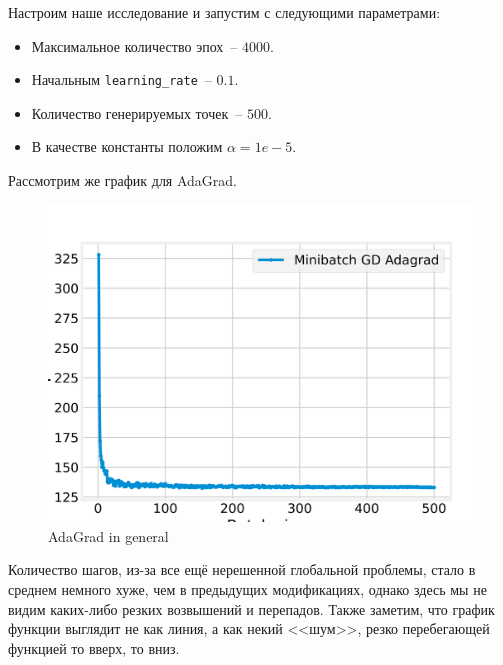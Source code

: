 \documentclass[12pt, a4paper, oneside, final]{article}
\begin{document}
	Настроим наше исследование и запустим с следующими параметрами:
	\begin{itemize}
		\item Максимальное количество эпох~-- $4000$.
		\item Начальным \texttt{learning\_rate}~-- $0.1$.
		\item Количество генерируемых точек~-- $500$.
		\item В качестве константы положим $\alpha = 1e-5$.
	\end{itemize}
	Рассмотрим же график для AdaGrad.
	\begin{figure}[H]
		\centering
		\includegraphics[scale = 0.9]{Image/T3_ADAGRAD_GENERAL.png}
		\caption*{AdaGrad in general}
	\end{figure}
	Количество шагов, из-за все ещё нерешенной глобальной проблемы, стало в среднем немного хуже, чем в предыдущих модификациях, однако здесь мы не видим каких-либо резких возвышений и перепадов.
	Также заметим, что график функции выглядит не как линия, а как некий <<шум>>, резко перебегающей функцией то вверх, то вниз.
\end{document}
